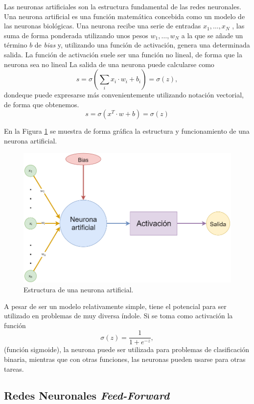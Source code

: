 \documentclass[spanish,a4paper, 11pt]{article}
\numberwithin{equation}{section}
\numberwithin{table}{section}
\numberwithin{figure}{section}
\begin{document}
Las neuronas artificiales son la estructura fundamental de las redes neuronales. Una neurona artificial es una función matemática concebida como un modelo de las neuronas biológicas. Una neurona recibe una serie de entradas $x_1, \hdots, x_N$ , las suma de forma ponderada utilizando unos pesos $w_1, \hdots, w_N$ a la que se añade un término $b$ de \textit{bias} y, utilizando una función de activación, genera una determinada salida. La función de activación suele ser una función no lineal, de forma que la neurona sea no lineal La salida de una neurona puede calcularse como
\begin{equation}
s = \sigma \left( \sum_i x_i \cdot w_i + b_i \right) = \sigma (z),
\end{equation}
dondeque puede expresarse más convenientemente utilizando notación vectorial, de forma que obtenemos.
\begin{equation}
s = \sigma(x^T \cdot w + b) = \sigma(z)
\end{equation}

En la Figura \ref{Neurona} se muestra de forma gráfica la estructura y funcionamiento de una neurona artificial.

\begin{figure}[H]
	\centering
	\includegraphics[width=0.6\linewidth]{Neurona.png}
	\caption{Estructura de una neurona artificial.}
	\label{Neurona}	
\end{figure}

A pesar de ser un modelo relativamente simple, tiene el potencial para ser utilizado en problemas de muy diversa índole. Si se toma como activación la función
\begin{equation}
\sigma(z) = \frac{1}{1+e^{-z}},
\end{equation}
(función sigmoide), la neurona puede ser utilizada para problemas de clasificación binaria, mientras que con otras funciones, las neuronas pueden usarse para otras tareas.

\subsection{Redes Neuronales \textit{Feed-Forward}}
\end{document}
